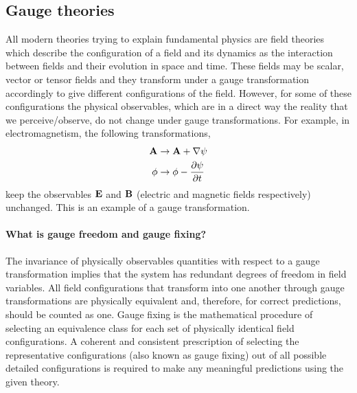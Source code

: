 \subsection{Gauge theories}
All modern theories trying to explain fundamental physics are field theories which describe the configuration of a field and its dynamics as the interaction between fields and their evolution in space and time. These fields may be scalar, vector or tensor fields and they transform under a gauge transformation accordingly to give different configurations of the field. However, for some of these configurations the physical observables, which are in a direct way the reality that we perceive/observe, do not change under gauge transformations. For example, in electromagnetism, the following transformations,
\begin{subequations}\begin{align}
 \bold{A} &\rightarrow \bold{A} + \nabla \psi  \\
 \phi &\rightarrow \phi - \frac{\partial \psi}{\partial t}\end{align} \end{subequations}
keep the observables $\bold{E}$ and $\bold{B}$ (electric and magnetic
fields respectively) unchanged. This is an example of a gauge
transformation.

\paragraph{What is gauge freedom and gauge fixing?}
The invariance of physically observables quantities with respect to a
gauge transformation implies that the system has redundant degrees of
freedom in field variables. All field configurations that transform into
one another through gauge transformations are physically equivalent and,
therefore, for correct predictions, should be counted as one. Gauge
fixing is the mathematical procedure of selecting an equivalence class
for each set of physically identical field configurations. A coherent and
consistent prescription of selecting the representative configurations
(also known as gauge fixing) out of all possible detailed configurations
is required to make any meaningful predictions using the given theory.


